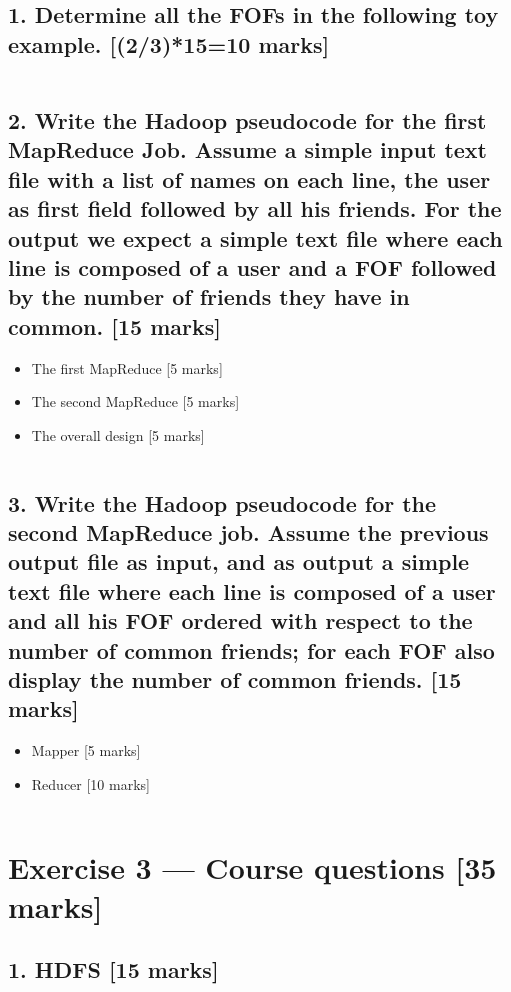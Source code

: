 \documentclass[11pt,a4paper]{article}
\begin{document}
\subsection*{1. Determine all the FOFs in the following toy example. [(2/3)*15=10 marks]}

\inputminted{shell}{../fof.txt}

\subsection*{2. Write the Hadoop pseudocode for the first MapReduce Job. Assume a simple input text file with a list of names on each line, the user as first field followed by all his friends. For the output we expect a simple text file where each line is composed of a user and a FOF followed by the number of friends they have in common. [15 marks]}

\begin{itemize}
\item The first MapReduce [5 marks]
\item The second MapReduce [5 marks]
\item The overall design [5 marks]
\end{itemize}

\inputminted{java}{../src/main/java/com/ve572/e1/FindFOF.java}

\subsection*{3. Write the Hadoop pseudocode for the second MapReduce job. Assume the previous output file as input, and as output a simple text file where each line is composed of a user and all his FOF ordered with respect to the number of common friends; for each FOF also display the number of common friends. [15 marks]}

\begin{itemize}
\item Mapper [5 marks]
\item Reducer [10 marks]
\end{itemize}

\inputminted{java}{../src/main/java/com/ve572/e1/CountFOF.java}

\section*{Exercise 3 --- Course questions [35 marks]}
\subsection*{1. HDFS [15 marks]}
\end{document}
